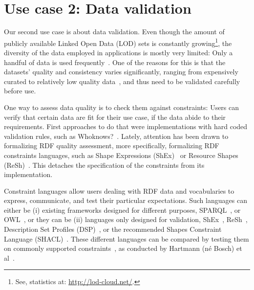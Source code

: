 \section{Use case 2: Data validation}\label{usecase2}
Our second use case is about data validation.
Even though the amount of publicly available Linked Open Data (LOD) sets is constantly growing\footnote{See, \eg statistics at: \url{http://lod-cloud.net/}.}, 
the diversity of the data employed in applications is mostly very limited:
Only a handful of \rdf data is used frequently~\cite{rietveld2015lod}.
One of the reasons for this is that the datasets' quality and consistency varies significantly,
ranging from expensively curated to relatively low quality data~\cite{zaveri2015quality},
and thus need to be validated carefully before use.

One way to assess data quality is to check them against constraints: 
Users can verify that certain data are fit for their use case,
if the data abide to their requirements.
First approaches to do that were implementations with hard coded validation rules,
such as Whoknows?~\cite{ketterl2011whoknows}.
Lately, attention has been drawn to formalizing RDF quality assessment, more specifically,
formalizing RDF constraints languages, such as Shape Expressions (ShEx)~\cite{shex} or Resource Shapes (ReSh)~\cite{resh}.
This detaches the specification of the constraints from its implementation.

Constraint languages allow users dealing with RDF data and vocabularies
to express, communicate, and test their particular expectations.
Such languages can either be (i) existing frameworks designed for different purposes, \eg 
 SPARQL~\cite{hartmann2016,kontokostas2014test},
or OWL~\cite{owlValidation},
or they can be (ii) languages only designed for validation, \eg
ShEx~\cite{shex},
ReSh~\cite{resh},
Description Set Profiles (DSP)~\cite{dsp},
or the \wwwc recommended Shapes Constraint Language (SHACL)~\cite{shacl}.
These different languages can be compared
by testing them on commonly supported constraints~\cite{bosch2015rdf,kontokostas2014test},
as conducted by Hartmann (n\'e Bosch) et al~\cite{bosch2015}.


